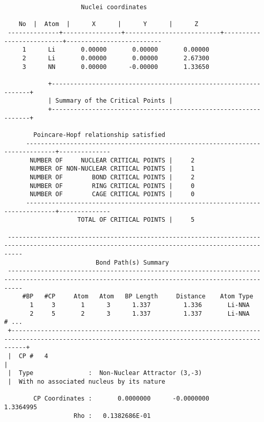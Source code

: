 \begin{lstlisting}
                     Nuclei coordinates 

    No  |  Atom  |      X      |      Y      |      Z    
 --------------+----------------+--------------------------+--------------------------+--------------------------
     1      Li       0.00000       0.00000       0.00000
     2      Li       0.00000       0.00000       2.67300
     3      NN       0.00000      -0.00000       1.33650

            +----------------------------------------------------------------+
            | Summary of the Critical Points |
            +----------------------------------------------------------------+

        Poincare-Hopf relationship satisfied
      ------------------------------------------------------------------------------+--------------
       NUMBER OF     NUCLEAR CRITICAL POINTS |     2    
       NUMBER OF NON-NUCLEAR CRITICAL POINTS |     1    
       NUMBER OF        BOND CRITICAL POINTS |     2    
       NUMBER OF        RING CRITICAL POINTS |     0    
       NUMBER OF        CAGE CRITICAL POINTS |     0    
      ------------------------------------------------------------------------------+--------------
                    TOTAL OF CRITICAL POINTS |     5    

 ------------------------------------------------------------------------------------------------------------------------------------------------
                         Bond Path(s) Summary
 ------------------------------------------------------------------------------------------------------------------------------------------------
     #BP   #CP     Atom   Atom   BP Length     Distance    Atom Type 
       1     3       1      3      1.337         1.336       Li-NNA
       2     5       2      3      1.337         1.337       Li-NNA
# ...
 +------------------------------------------------------------------------------------------------------------------------------------------------+
 |  CP #   4                                                              |
 |  Type               :  Non-Nuclear Attractor (3,-3)
 |  With no associated nucleus by its nature
 
        CP Coordinates :       0.0000000      -0.0000000       1.3364995
                   Rho :   0.1382686E-01
\end{lstlisting}

